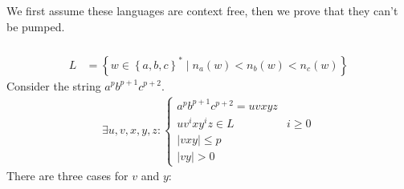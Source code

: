 \documentclass{article}
\numberwithin{equation}{subsection}
\newcommand{\abs}[1]{\vert #1\vert}
\begin{document}
\subsection{}
We first assume these languages are context free, then we prove that they can't be pumped.
\subsubsection{}
\begin{align*}
L&=\left\{w\in \left\{a, b, c\right\}^*\mid n_a(w) < n_b(w) < n_c(w)\right\}
\end{align*}
Consider the string \(a^pb^{p+1}c^{p+2}\).
\begin{align*}
\exists u,v,x,y,z:
\begin{cases}
a^pb^{p+1}c^{p+2} = uvxyz&\\
uv^ixy^iz\in L & i\ge 0\\
\abs{vxy} \le p&\\
\abs{vy} > 0&
\end{cases}
\end{align*}
There are three cases for \(v\) and \(y\):
\end{document}
